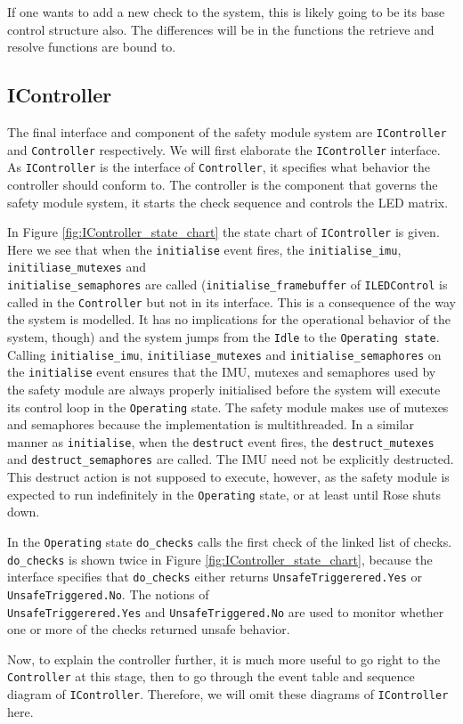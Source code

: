 \documentclass[12pt]{scrreprt}
\begin{document}
If one wants to add a new check to the system, this is likely going to be its base control structure also. The differences will be in the functions the retrieve and resolve functions are bound to.

\subsection{IController}
The final interface and component of the safety module system are \texttt{IController} and \texttt{Controller} respectively. We will first elaborate the \texttt{IController} interface. As \texttt{IController} is the interface of \texttt{Controller}, it specifies what behavior the controller should conform to. The controller is the component that governs the safety module system, it starts the check sequence and controls the LED matrix.
\par
In Figure \ref{fig:IController_state_chart} the state chart of \texttt{IController} is given. Here we see that when the \texttt{initialise} event fires, the \texttt{initialise\_imu}, \texttt{initiliase\_mutexes} and\\\texttt{initialise\_semaphores} are called (\texttt{initialise\_framebuffer} of \texttt{ILEDControl} is called in the \texttt{Controller} but not in its interface. This is a consequence of the way the system is modelled. It has no implications for the operational behavior of the system, though) and the system jumps from the \texttt{Idle} to the \texttt{Operating state}. Calling \texttt{initialise\_imu}, \texttt{initiliase\_mutexes} and \texttt{initialise\_semaphores} on the \texttt{initialise} event ensures that the IMU, mutexes and semaphores used by the safety module are always properly initialised before the system will execute its control loop in the \texttt{Operating} state. The safety module makes use of mutexes and semaphores because the implementation is multithreaded. In a similar manner as \texttt{initialise}, when the \texttt{destruct} event fires, the \texttt{destruct\_mutexes} and \texttt{destruct\_semaphores} are called. The IMU need not be explicitly destructed. This destruct action is not supposed to execute, however, as the safety module is expected to run indefinitely in the \texttt{Operating} state, or at least until Rose shuts down.
\par
In the \texttt{Operating} state \texttt{do\_checks} calls the first check of the linked list of checks. \texttt{do\_checks} is shown twice in Figure \ref{fig:IController_state_chart}, because the interface specifies that \texttt{do\_checks} either returns \texttt{UnsafeTriggerered.Yes} or \texttt{UnsafeTriggered.No}. The notions of\\\texttt{UnsafeTriggerered.Yes} and \texttt{UnsafeTriggered.No} are used to monitor whether one or more of the checks returned unsafe behavior.
\par
Now, to explain the controller further, it is much more useful to go right to the \texttt{Controller} at this stage, then to go through the event table and sequence diagram of \texttt{IController}. Therefore, we will omit these diagrams of \texttt{IController} here.
\end{document}
